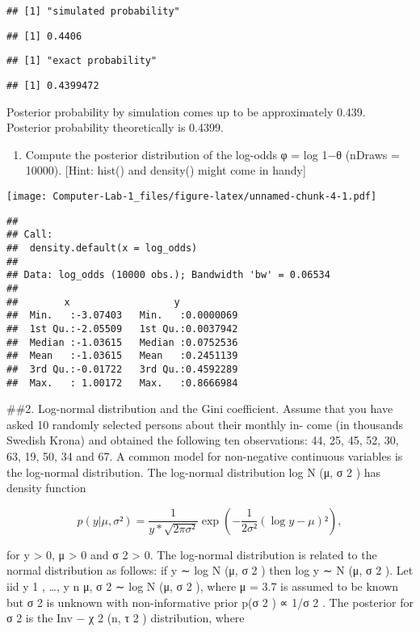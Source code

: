 \documentclass[]{article}
\providecommand{\tightlist}{%
  \setlength{\itemsep}{0pt}\setlength{\parskip}{0pt}}
\begin{document}
\begin{verbatim}
## [1] "simulated probability"
\end{verbatim}

\begin{verbatim}
## [1] 0.4406
\end{verbatim}

\begin{verbatim}
## [1] "exact probability"
\end{verbatim}

\begin{verbatim}
## [1] 0.4399472
\end{verbatim}

Posterior probability by simulation comes up to be approximately 0.439.
Posterior probability theoretically is 0.4399.

\begin{enumerate}
\def\labelenumi{(\alph{enumi})}
\setcounter{enumi}{2}
\tightlist
\item
  Compute the posterior distribution of the log-odds φ = log 1−θ (nDraws
  = 10000). {[}Hint: hist() and density() might come in handy{]}
\end{enumerate}

\texttt{[image: Computer-Lab-1\_files/figure-latex/unnamed-chunk-4-1.pdf]}

\begin{verbatim}
## 
## Call:
##  density.default(x = log_odds)
## 
## Data: log_odds (10000 obs.); Bandwidth 'bw' = 0.06534
## 
##        x                  y            
##  Min.   :-3.07403   Min.   :0.0000069  
##  1st Qu.:-2.05509   1st Qu.:0.0037942  
##  Median :-1.03615   Median :0.0752536  
##  Mean   :-1.03615   Mean   :0.2451139  
##  3rd Qu.:-0.01722   3rd Qu.:0.4592289  
##  Max.   : 1.00172   Max.   :0.8666984
\end{verbatim}

\#\#2. Log-normal distribution and the Gini coefficient. Assume that you
have asked 10 randomly selected persons about their monthly in- come (in
thousands Swedish Krona) and obtained the following ten observations:
44, 25, 45, 52, 30, 63, 19, 50, 34 and 67. A common model for
non-negative continuous variables is the log-normal distribution. The
log-normal distribution log N (μ, σ 2 ) has density function

\[p(y| \mu, \sigma²) = \frac{1}{y*\sqrt{2\pi\sigma²}}\exp(-\frac{1}{2\sigma²}(\log y-\mu)²),\]

for y \textgreater{} 0, μ \textgreater{} 0 and σ 2 \textgreater{} 0. The
log-normal distribution is related to the normal distribution as
follows: if y ∼ log N (μ, σ 2 ) then log y ∼ N (μ, σ 2 ). Let iid y 1 ,
\ldots{}, y n \textbar{}μ, σ 2 ∼ log N (μ, σ 2 ), where μ = 3.7 is
assumed to be known but σ 2 is unknown with non-informative prior p(σ 2
) ∝ 1/σ 2 . The posterior for σ 2 is the Inv − χ 2 (n, τ 2 )
distribution, where
\end{document}
